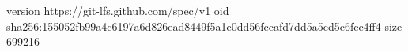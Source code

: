 version https://git-lfs.github.com/spec/v1
oid sha256:155052fb99a4c6197a6d826ead8449f5a1e0dd56fccafd7dd5a5cd5c6fcc4ff4
size 699216
